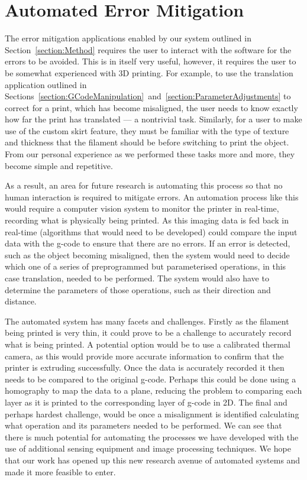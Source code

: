 \documentclass[pdftex, 11pt]{report} %
\begin{document}
\section{Automated Error Mitigation}
The error mitigation applications enabled by our system outlined in Section~\ref{section:Method} requires the user to interact with the software for the errors to be avoided. This is in itself very useful, however, it requires the user to be somewhat experienced with 3D printing. For example, to use the translation application outlined in Sections~\ref{section:GCodeManipulation}~and~\ref{section:ParameterAdjustments} to correct for a print, which has become misaligned, the user needs to know exactly how far the print has translated --- a nontrivial task. Similarly, for a user to make use of the custom skirt feature, they must be familiar with the type of texture and thickness that the filament should be before switching to print the object. From our personal experience as we performed these tasks more and more, they become simple and repetitive. 

As a result, an area for future research is automating this process so that no human interaction is required to mitigate errors. An automation process like this would require a computer vision system to monitor the printer in real-time, recording what is physically being printed. As this imaging data is fed back in real-time (algorithms that would need to be developed) could compare the input data with the g-code to ensure that there are no errors. If an error is detected, such as the object becoming misaligned, then the system would need to decide which one of a series of preprogrammed but parameterised operations, in this case translation, needed to be performed. The system would also have to determine the parameters of those operations, such as their direction and distance. 

The automated system has many facets and challenges. Firstly as the filament being printed is very thin, it could prove to be a challenge to accurately record what is being printed. A potential option would be to use a calibrated thermal camera, as this would provide more accurate information to confirm that the printer is extruding successfully. Once the data is accurately recorded it then needs to be compared to the original g-code. Perhaps this could be done using a homography to map the data to a plane, reducing the problem to comparing each layer as it is printed to the corresponding layer of g-code in 2D. The final and perhaps hardest challenge, would be once a misalignment is identified calculating what operation and its parameters needed to be performed. We can see that there is much potential for automating the processes we have developed with the use of additional sensing equipment and image processing techniques. We hope that our work has opened up this new research avenue of automated systems and made it more feasible to enter.
\end{document}
